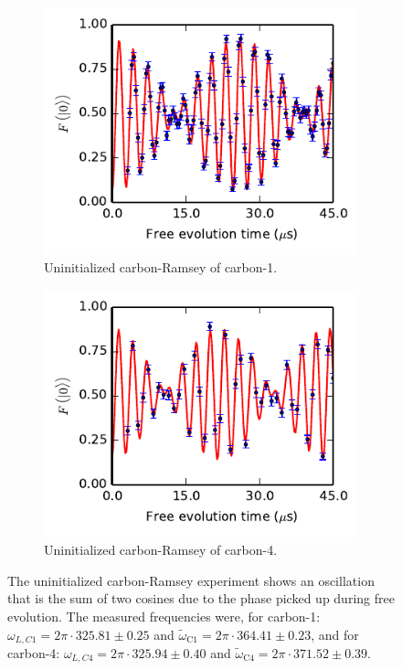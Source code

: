 \begin{figure}[htbp]
    \begin{subfigure}[t]{0.49\textwidth}\centering
    \includegraphics{Img/CarbonRamsey_C1.pdf}
    \caption{Uninitialized carbon-Ramsey of carbon-1.}
    \label{fig:CR_C1}
    \end{subfigure}
    \begin{subfigure}[t]{0.49\textwidth}\centering
        \includegraphics{Img/CarbonRamsey_C4.pdf}
        \caption{Uninitialized carbon-Ramsey of carbon-4.}
        \label{fig:CR_C4}
    \end{subfigure}
    \caption{The uninitialized carbon-Ramsey experiment shows an oscillation that is the sum of two cosines due to the phase picked up during free evolution. The measured frequencies were, for carbon-1: $\omega_{L,C1} = 2\pi\cdot 325.81 \pm 0.25$ and  $\tilde \omega_{\mathrm{C1}}= 2\pi\cdot 364.41 \pm 0.23$, and for carbon-4: $\omega_{L,C4} =  2\pi\cdot 325.94 \pm 0.40$ and $\tilde \omega_{\mathrm{C4}} = 2\pi\cdot 371.52 \pm 0.39 $.}
    \label{fig:Uninitialized_carbon_ramsey}
\end{figure}

